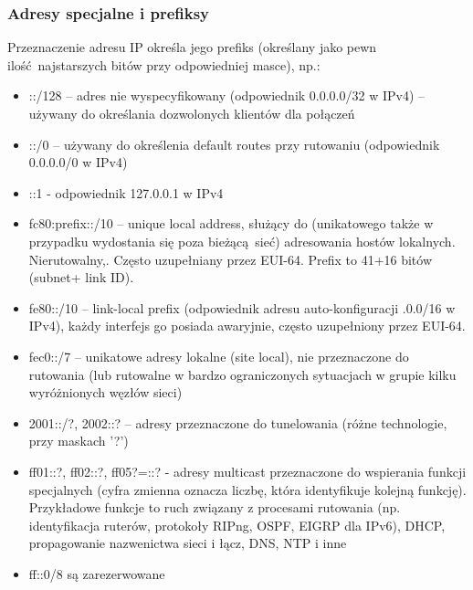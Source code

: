 \documentclass[a4paper, 12pt, titlepage]{article}
\begin{document}
			\subsubsection{Adresy specjalne i prefiksy}
				Przeznaczenie adresu IP określa jego prefiks (określany jako pewn ilość najstarszych bitów przy odpowiedniej masce), np.:
				\begin{itemize}
					\item ::/128 -- adres nie wyspecyfikowany (odpowiednik 0.0.0.0/32 w IPv4) -- używany do określania dozwolonych klientów dla połączeń
					\item ::/0 -- używany do określenia default routes przy rutowaniu (odpowiednik 0.0.0.0/0 w IPv4)
					\item ::1 - odpowiednik 127.0.0.1 w IPv4
					\item fc80:prefix::/10 -- unique local address, służący do (unikatowego także w przypadku wydostania się poza bieżącą sieć) adresowania hostów lokalnych. Nierutowalny,. Często uzupełniany przez EUI-64. Prefix to 41+16 bitów (subnet+ link ID).
					\item fe80::/10 -- link-local prefix (odpowiednik adresu auto-konfiguracji .0.0/16 w IPv4), każdy interfejs go posiada awaryjnie, często uzupełniony przez EUI-64.
					\item fec0::/7 -- unikatowe adresy lokalne (site local), nie przeznaczone do rutowania (lub rutowalne w bardzo ograniczonych sytuacjach w grupie kilku wyróżnionych węzłów sieci)
					\item 2001::/?, 2002::? -- adresy przeznaczone do tunelowania (różne technologie, przy maskach '?')
					\item ff01::?, ff02::?, ff05?=::? - adresy multicast przeznaczone do wspierania funkcji specjalnych (cyfra zmienna oznacza liczbę, która identyfikuje kolejną funkcję). Przykładowe funkcje to ruch związany z procesami rutowania (np. identyfikacja ruterów, protokoły RIPng, OSPF, EIGRP dla IPv6), DHCP, propagowanie nazwenictwa sieci i łącz, DNS, NTP i inne
					\item ff::0/8 są zarezerwowane
				\end{itemize}
\end{document}

